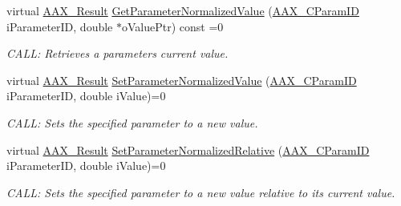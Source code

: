 \begin{Indent}
\begin{DoxyCompactItemize}
virtual \mbox{\hyperlink{a00392_a4d8f69a697df7f70c3a8e9b8ee130d2f}{A\+A\+X\+\_\+\+Result}} \mbox{\hyperlink{a01669_a18e3407bac178a9b0339bd6f95e74a17}{Get\+Parameter\+Normalized\+Value}} (\mbox{\hyperlink{a00392_a1440c756fe5cb158b78193b2fc1780d1}{A\+A\+X\+\_\+\+C\+Param\+ID}} i\+Parameter\+ID, double $\ast$o\+Value\+Ptr) const =0
\begin{DoxyCompactList}\small\item\em C\+A\+LL\+: Retrieves a parameter\textquotesingle{}s current value. \end{DoxyCompactList}\item 
virtual \mbox{\hyperlink{a00392_a4d8f69a697df7f70c3a8e9b8ee130d2f}{A\+A\+X\+\_\+\+Result}} \mbox{\hyperlink{a01669_a368b0f5a761d1eda4c41b420f153a077}{Set\+Parameter\+Normalized\+Value}} (\mbox{\hyperlink{a00392_a1440c756fe5cb158b78193b2fc1780d1}{A\+A\+X\+\_\+\+C\+Param\+ID}} i\+Parameter\+ID, double i\+Value)=0
\begin{DoxyCompactList}\small\item\em C\+A\+LL\+: Sets the specified parameter to a new value. \end{DoxyCompactList}\item 
virtual \mbox{\hyperlink{a00392_a4d8f69a697df7f70c3a8e9b8ee130d2f}{A\+A\+X\+\_\+\+Result}} \mbox{\hyperlink{a01669_a6e28a427a0d7d0c8df69dd5eb88cff6c}{Set\+Parameter\+Normalized\+Relative}} (\mbox{\hyperlink{a00392_a1440c756fe5cb158b78193b2fc1780d1}{A\+A\+X\+\_\+\+C\+Param\+ID}} i\+Parameter\+ID, double i\+Value)=0
\begin{DoxyCompactList}\small\item\em C\+A\+LL\+: Sets the specified parameter to a new value relative to its current value. \end{DoxyCompactList}\end{DoxyCompactItemize}
\end{Indent}
